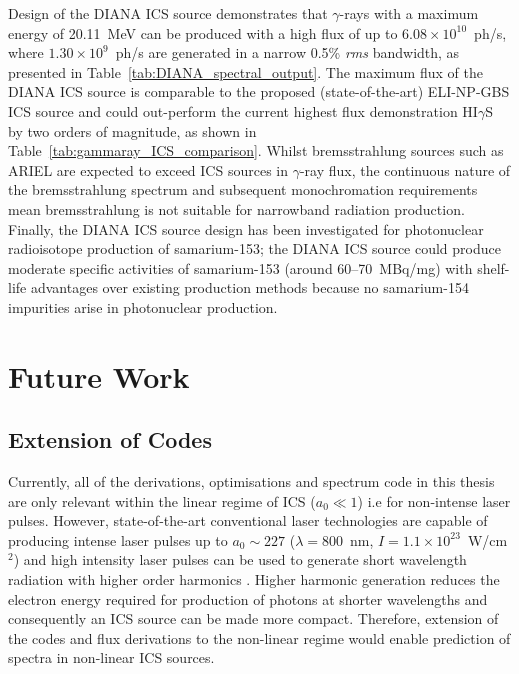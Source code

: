 \documentclass[../main.tex]{subfiles}
\begin{document}
Design of the DIANA ICS source demonstrates that $\gamma$-rays with a maximum energy of 20.11~\si{\mega\electronvolt} can be produced with a high flux of up to $6.08\times 10^{10}$~ph/\si{\second}, where $1.30\times 10^{9}$~ph/\si{\second} are generated in a narrow 0.5\% \textit{rms} bandwidth, as presented in Table~\ref{tab:DIANA_spectral_output}. The maximum flux of the DIANA ICS source is comparable to the proposed (state-of-the-art) ELI-NP-GBS \cite{elinp2019vega,tanaka2020current} ICS source and could out-perform the current highest flux demonstration HI$\gamma$S \cite{weller2009research} by two orders of magnitude, as shown in Table~\ref{tab:gammaray_ICS_comparison}. Whilst bremsstrahlung sources such as ARIEL \cite{dilling2013ariel,lebois2011simulations} are expected to exceed ICS sources in $\gamma$-ray flux, the continuous nature of the bremsstrahlung spectrum and subsequent monochromation requirements mean bremsstrahlung is not suitable for narrowband radiation production. Finally, the DIANA ICS source design has been investigated for photonuclear radioisotope production of samarium-153; the DIANA ICS source could produce moderate specific activities of samarium-153 (around 60--70~\si{\mega\becquerel}/\si{\milli\gram}) with shelf-life advantages over existing production methods because no samarium-154 impurities arise in photonuclear production. 

\section{Future Work}

\subsection{Extension of Codes}
Currently, all of the derivations, optimisations and spectrum code in this thesis are only relevant within the linear regime of ICS ($a_{0}\ll 1$) i.e for non-intense laser pulses. However, state-of-the-art conventional laser technologies are capable of producing intense laser pulses up to $a_{0}\sim227$ \cite{yoon2021realization} ($\lambda = 800$~\si{\nano\meter}, $I = 1.1\times 10^{23}$~\si{\watt}/\si{\centi\meter}$^{2}$) and high intensity laser pulses can be used to generate short wavelength radiation with higher order harmonics \cite{babzien2006observation,seipt2011nonlinear}. Higher harmonic generation reduces the electron energy required for production of photons at shorter wavelengths and consequently an ICS source can be made more compact. Therefore, extension of the codes and flux derivations to the non-linear regime would enable prediction of spectra in non-linear ICS sources. 
\end{document}
